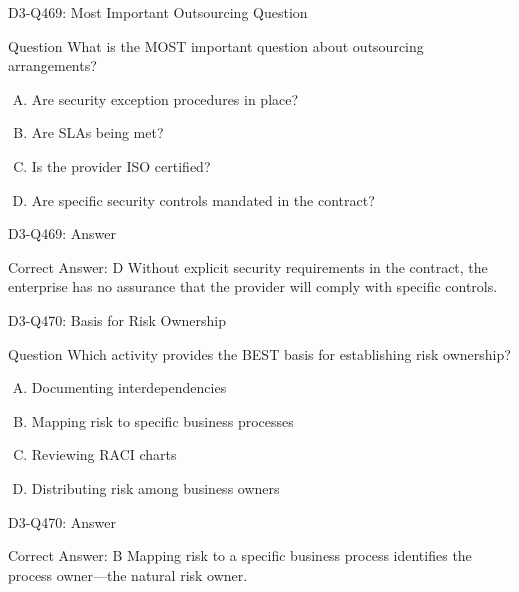\documentclass{beamer}
\begin{document}
\begin{frame}{D3-Q469: Most Important Outsourcing Question}
	\begin{block}{Question}
		What is the MOST important question about outsourcing arrangements?
	\end{block}
	\begin{enumerate}[(A)]
		\item Are security exception procedures in place?
		\item Are SLAs being met?
		\item Is the provider ISO certified?
		\item Are specific security controls mandated in the contract?
	\end{enumerate}
\end{frame}
\begin{frame}{D3-Q469: Answer}
	\begin{block}{Correct Answer: D}
		Without explicit security requirements in the contract, the enterprise has no assurance that the provider will comply with specific controls.
	\end{block}
\end{frame}

\begin{frame}{D3-Q470: Basis for Risk Ownership}
	\begin{block}{Question}
		Which activity provides the BEST basis for establishing risk ownership?
	\end{block}
	\begin{enumerate}[(A)]
		\item Documenting interdependencies
		\item Mapping risk to specific business processes
		\item Reviewing RACI charts
		\item Distributing risk among business owners
	\end{enumerate}
\end{frame}
\begin{frame}{D3-Q470: Answer}
	\begin{block}{Correct Answer: B}
		Mapping risk to a specific business process identifies the process owner—the natural risk owner.
	\end{block}
\end{frame}
\end{document}
